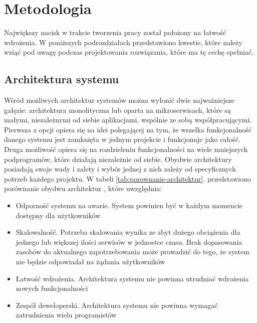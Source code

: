 \clearpage
\section{Metodologia}

Największy nacisk w trakcie tworzenia pracy został położony na łatwość wdrożenia. 
W poniższych podrozdziałach przedstawiono kwestie, które należy wziąć pod uwagę
podczas projektowania rozwiązania, które ma tę cechę spełniać.

\subsection{Architektura systemu}

Wśród możliwych architektur systemów można wyłonić dwie najważniejsze gałęzie: 
architektura monolityczna lub oparta na mikroserwisach, które są małymi, niezależnymi 
od siebie aplikacjami, wspólnie ze sobą współpracującymi. Pierwsza z opcji opiera się 
na idei polegającej na tym, że wszelka funkcjonalność danego systemu jest zamknięta 
w jednym projekcie i funkcjonuje jako całość. Druga możliwość opiera się na 
rozdzieleniu funkcjonalności na wiele mniejszych podprogramów, które działają 
niezależnie od siebie. Obydwie architektury posiadają swoje wady i zalety i wybór 
jednej z nich zależy od specyficznych potrzeb każdego projektu. W tabeli 
\ref{tab:porownanie-architektur}. przedstawiono porównanie obydwu architektur 
\cite{newmanb2015}, które 
uwzględnia:

\begin{itemize} %
    \item Odporność systemu na awarie. System powinien być w każdym momencie dostępny 
    dla użytkowników
    \item Skalowalność. Potrzeba skalowania wynika ze zbyt dużego obciążenia dla jednego 
    lub większej ilości serwisów w jednostce czasu. Brak dopasowania zasobów do 
    aktualnego zapotrzebowania może prowadzić do tego, że system nie będzie odpowiadał 
    na żądania użytkowników
    \item Łatwość wdrożenia. Architektura systemu nie powinna utrudniać wdrożenia nowych 
    funkcjonalności
    \item Zespół deweloperski. Architektura systemu nie powinna wymagać zatrudnienia 
    wielu programistów
\end{itemize}

